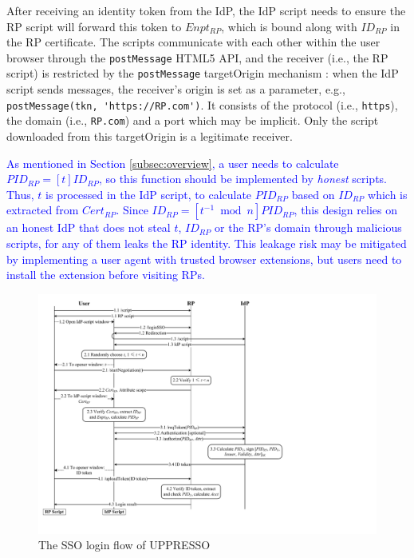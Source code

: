 After %
 receiving an identity token from the IdP,
    the IdP script needs to ensure the RP script will forward this token to $Enpt_{RP}$,
        which is bound along with $ID_{RP}$ in the RP certificate.
The scripts communicate with each other within the user browser through the \verb+postMessage+ HTML5 API,
and the receiver (i.e., the RP script)
 is restricted by the \verb+postMessage+ targetOrigin mechanism \cite{postm-targeto}:
when the IdP script sends messages,
 the receiver's origin is set as a parameter,
  e.g., \verb+postMessage(tkn, 'https://RP.com')+.
It consists of
    the protocol (i.e., \verb+https+),
    the domain  (i.e., \verb+RP.com+)
    and a port which may be implicit.
Only the script downloaded from this targetOrigin is a legitimate receiver.


\textcolor{blue}{As mentioned in Section \ref{subsec:overview},
    a user needs to calculate $PID_{RP} = [t]ID_{RP}$,
    so this function should be implemented by \emph{honest} scripts.
Thus, $t$ is processed in the IdP script,
    to calculate $PID_{RP}$ based on $ID_{RP}$ which is extracted from $Cert_{RP}$.
Since $ID_{RP} = [t^{-1}\bmod n]PID_{RP}$,
    this design relies on an honest IdP that does not steal $t$, $ID_{RP}$ or the RP's domain through malicious scripts,
        for any of them leaks the RP identity.
This leakage risk may be mitigated
    by implementing a user agent with trusted browser extensions,
but users need to install the extension before visiting RPs.}

\begin{figure}[htb]
  \centering
  \includegraphics[height=0.575\textheight]{fig/process-js.pdf}
  \caption{The SSO login flow of UPPRESSO}
  \label{fig:process}
\end{figure}


